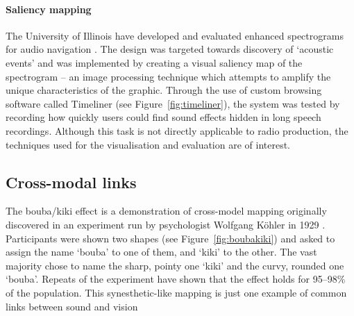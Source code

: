 \paragraph{Saliency mapping}
The University of Illinois have developed and evaluated enhanced spectrograms
for audio navigation \cite{Goudeseune2012,Lin2013}. The design was targeted
towards discovery of `acoustic events' and was implemented by creating a visual
saliency map of the spectrogram -- an image processing technique which attempts
to amplify the unique characteristics of the graphic.  Through the use of
custom browsing software called Timeliner (see Figure~\ref{fig:timeliner}), the
system was tested by recording how quickly users could find sound effects
hidden in long speech recordings. Although this task is not directly
applicable to radio production, the techniques used for the visualisation and
evaluation are of interest.

\subsection{Cross-modal links}\label{sec:litreviewmodal}
The bouba/kiki effect is a demonstration of cross-model mapping originally
discovered in an experiment run by psychologist Wolfgang K\"{o}hler in 1929
\cite{Koehler1929}. Participants were shown two shapes (see
Figure~\ref{fig:boubakiki}) and asked to assign the name `bouba' to one of
them, and `kiki' to the other. The vast majority chose to name the sharp,
pointy one `kiki' and the curvy, rounded one `bouba'. Repeats of the experiment
\cite{Ramachandran2001} have shown that the effect holds for 95--98\% of the
population. This synesthetic-like mapping \cite{Hubbard1996} is just one
example of common links between sound and vision

